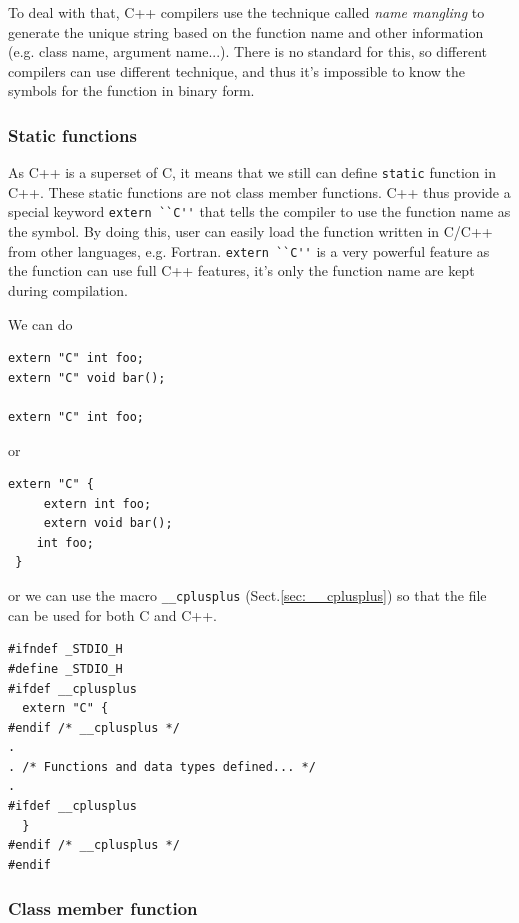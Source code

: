 To deal with that, C++ compilers use the technique called {\it name mangling} to
generate the unique string based on the function name and other information
(e.g. class name, argument name...). There is no standard for this, so different
compilers can use different technique, and thus it's impossible to know the
symbols for the function in binary form.

\subsubsection{Static functions}
\label{sec:static-functions}

As C++ is a superset of C, it means that we still can define \verb!static!
function in C++. These static functions are not class member functions.  C++
thus provide a special keyword \verb!extern ``C''! that tells the compiler to
use the function name as the symbol. By doing this, user can easily load the
function written in C/C++ from other languages, e.g. Fortran.
\verb!extern ``C''! is a very powerful feature as the function can use full C++
features, it's only the function name are kept during compilation.

We can do
\begin{lstlisting}
extern "C" int foo;
extern "C" void bar();

extern "C" int foo;

\end{lstlisting}
or
\begin{lstlisting}
extern "C" {
     extern int foo;
     extern void bar();
    int foo;
 }
\end{lstlisting}
or we can use the macro \verb!__cplusplus! (Sect.\ref{sec:__cplusplus}) so that
the file can be used for both C and C++. 
\begin{lstlisting}
#ifndef _STDIO_H
#define _STDIO_H
#ifdef __cplusplus
  extern "C" {
#endif /* __cplusplus */
.
. /* Functions and data types defined... */
.
#ifdef __cplusplus
  }
#endif /* __cplusplus */
#endif
\end{lstlisting}

\subsubsection{Class member function}
\label{sec:classs-function}

